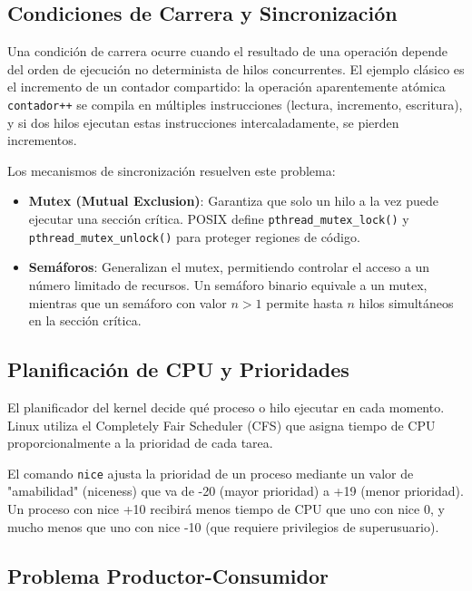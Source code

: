 \documentclass[conference]{IEEEtran}
\begin{document}
\subsection{Condiciones de Carrera y Sincronización}

Una condición de carrera ocurre cuando el resultado de una operación depende del orden de ejecución no determinista de hilos concurrentes. El ejemplo clásico es el incremento de un contador compartido: la operación aparentemente atómica \texttt{contador++} se compila en múltiples instrucciones (lectura, incremento, escritura), y si dos hilos ejecutan estas instrucciones intercaladamente, se pierden incrementos.

Los mecanismos de sincronización resuelven este problema:

\begin{itemize}
	\item \textbf{Mutex (Mutual Exclusion)}: Garantiza que solo un hilo a la vez puede ejecutar una sección crítica. POSIX define \texttt{pthread\_mutex\_lock()} y \texttt{pthread\_mutex\_unlock()} para proteger regiones de código.

	\item \textbf{Semáforos}: Generalizan el mutex, permitiendo controlar el acceso a un número limitado de recursos. Un semáforo binario equivale a un mutex, mientras que un semáforo con valor $n > 1$ permite hasta $n$ hilos simultáneos en la sección crítica.
\end{itemize}

\subsection{Planificación de CPU y Prioridades}

El planificador del kernel decide qué proceso o hilo ejecutar en cada momento. Linux utiliza el Completely Fair Scheduler (CFS) que asigna tiempo de CPU proporcionalmente a la prioridad de cada tarea.

El comando \texttt{nice} ajusta la prioridad de un proceso mediante un valor de "amabilidad" (niceness) que va de -20 (mayor prioridad) a +19 (menor prioridad). Un proceso con nice +10 recibirá menos tiempo de CPU que uno con nice 0, y mucho menos que uno con nice -10 (que requiere privilegios de superusuario).

\subsection{Problema Productor-Consumidor}
\end{document}
